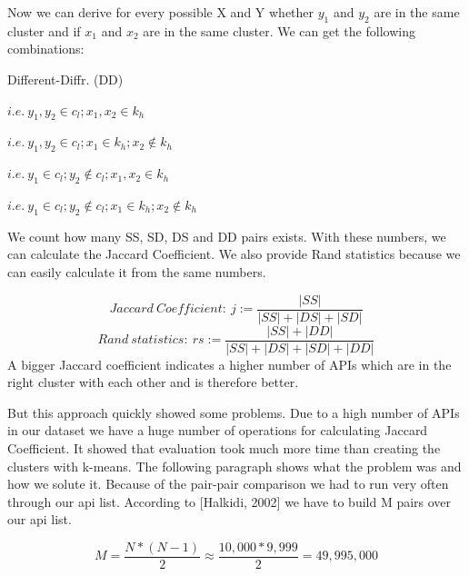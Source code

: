 \documentclass[a4paper]{IEEEtran}
\begin{document}
Now we can derive for every possible X and Y whether $y_1$  and $y_2$ are in the same cluster and if $x_1$  and $x_2$ are in the same cluster. We can get the following combinations: \\
\begin{labeling}{Different-Diffr. (DD)}
\item [Same-same (SS)]  $i.e.~y_1,y_2 \in c_l; x_1,x_2∈k_h$ \\
\item [Same-Different (SD)]  $i.e.~ y_1,y_2 \in c_l; x_1 \in k_h; x_2 \notin k_h$ \\
\item [Different-Same (DS)]  $i.e.~ y_1 \in c_l; y_2 \notin c_l; x_1,x_2 \in k_h$ \\
\item [Different-Diffr. (DD)]  $i.e.~y_1 \in c_l; y_2 \notin c_l; x_1 \in k_h;x_2 \notin k_h$
\end{labeling}

We count how many SS, SD, DS and DD pairs exists. With these numbers, we can calculate the Jaccard Coefficient. We also provide Rand statistics because we can easily calculate it from the same numbers.

\begin{equation*}
Jaccard~Coefficient:~ j:= \frac{|SS|}{|SS|+|DS|+|SD|}
\end{equation*}
\begin{equation*}
Rand~statistics:~ rs:= \frac{|SS|+|DD|}{|SS|+|DS|+|SD|+|DD|}
\end{equation*}
A bigger Jaccard coefficient indicates a higher number of APIs which are in the right cluster with each other and is therefore better.

But this approach quickly showed some problems. Due to a high number of APIs in our dataset we have a huge number of operations for calculating Jaccard Coefficient. It showed that evaluation took much more time than creating the clusters with k-means. The following paragraph shows what the problem was and how we solute it.
Because of the pair-pair comparison we had to run very often through our api list. According to [Halkidi, 2002] we have to build M pairs over our api list.

\begin{equation*}
M= \frac{N*(N-1)}{2}\approx \frac{10,000*9,999}{2}=49,995,000
\end{equation*}
\end{document}
